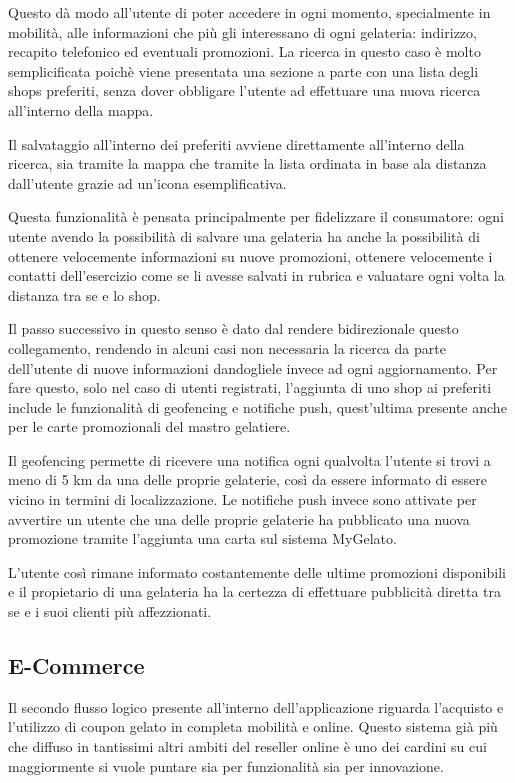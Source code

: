Questo dà modo all'utente di poter accedere in ogni momento, specialmente in mobilità, alle informazioni che più gli interessano di ogni gelateria: indirizzo, recapito telefonico ed eventuali promozioni.
La ricerca in questo caso è molto semplicificata poichè viene presentata una sezione a parte con una lista degli shops preferiti, senza dover obbligare l'utente ad effettuare una nuova ricerca all'interno della mappa.

Il salvataggio all'interno dei preferiti avviene direttamente all'interno della ricerca, sia tramite la mappa che tramite la lista ordinata in base ala distanza dall'utente grazie ad un'icona esemplificativa.

Questa funzionalità è pensata principalmente per fidelizzare il consumatore: ogni utente avendo la possibilità di salvare una gelateria ha anche la possibilità di ottenere velocemente informazioni su nuove promozioni, ottenere velocemente i contatti dell'esercizio come se li avesse salvati in rubrica e valuatare ogni volta la distanza tra se e lo shop.

Il passo successivo in questo senso è dato dal rendere bidirezionale questo collegamento, rendendo in alcuni casi non necessaria la ricerca da parte dell'utente di nuove informazioni dandogliele invece ad ogni aggiornamento.
Per fare questo, solo nel caso di utenti registrati, l'aggiunta di uno shop ai preferiti include le funzionalità di geofencing e notifiche push, quest'ultima presente anche per le carte promozionali del mastro gelatiere.

Il geofencing permette di ricevere una notifica ogni qualvolta l'utente si trovi a meno di 5 km da una delle proprie gelaterie, così da essere informato di essere vicino in termini di localizzazione.
Le notifiche push invece sono attivate per avvertire un utente che una delle proprie gelaterie ha pubblicato una nuova promozione tramite l'aggiunta una carta sul sistema MyGelato.

L'utente così rimane informato costantemente delle ultime promozioni disponibili e il propietario di una gelateria ha la certezza di effettuare pubblicità diretta tra se e i suoi clienti più affezzionati.

\subsection{E-Commerce}
Il secondo flusso logico presente all'interno dell'applicazione riguarda l'acquisto e l'utilizzo di coupon gelato in completa mobilità e online.
Questo sistema già più che diffuso in tantissimi altri ambiti del reseller online è uno dei cardini su cui maggiormente si vuole puntare sia per funzionalità sia per innovazione.

